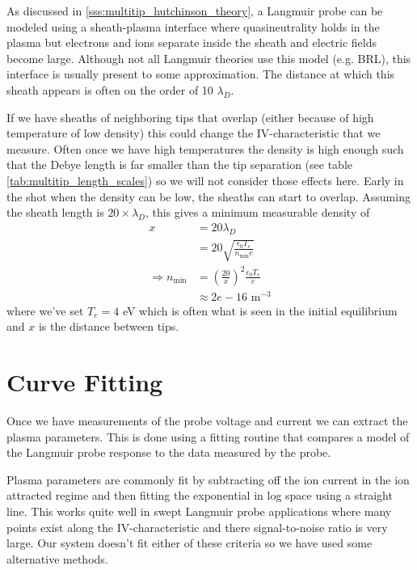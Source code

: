 As discussed in \ref{sss:multitip_hutchinson_theory}, a Langmuir probe can be modeled using a sheath-plasma interface where quasineutrality holds in the plasma but electrons and ions separate inside the sheath and electric fields become large. Although not all Langmuir theories use this model (e.g. BRL), this interface is usually present to some approximation. The distance at which this sheath appears is often on the order of 10 $\lambda_D$.


If we have sheaths of neighboring tips that overlap (either because of high temperature of low density) this could change the IV-characteristic that we measure. Often once we have high temperatures the density is high enough such that the Debye length is far smaller than the tip separation (see table \ref{tab:multitip_length_scales}) so we will not consider those effects here. Early in the shot when the density can be low, the sheaths can start to overlap. Assuming the sheath length is $20 \times \lambda_D$, this gives a minimum measurable density of
\begin{align}
    x &= 20 \lambda_D \\
    &= 20 \sqrt{\frac{\epsilon_0 T_e}{n_\text{min} e}} \\
    \Rightarrow n_\text{min} &= \left(\frac{20}{x}\right)^2 \frac{\epsilon_0 T_e}{e} \\
    &\approx 2e-16 \text{ m}^{-3}
\end{align}
where we've set $T_e = 4$ eV which is often what is seen in the initial equilibrium and $x$ is the distance between tips.

\section{Curve Fitting}

Once we have measurements of the probe voltage and current we can extract the plasma parameters. This is done using a fitting routine that compares a model of the Langmuir probe response to the data measured by the probe.

Plasma parameters are commonly fit by subtracting off the ion current in the ion attracted regime and then fitting the exponential in log space using a straight line. This works quite well in swept Langmuir probe applications where many points exist along the IV-characteristic and there signal-to-noise ratio is very large. Our system doesn't fit either of these criteria so we have used some alternative methods.

